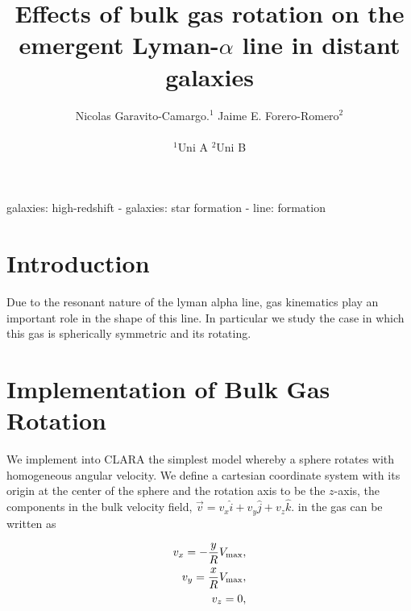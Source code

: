 \documentclass[usenatbib]{mn2e}
\begin{document}
\title[Rotation in the Lyman-$\alpha$ line]{Effects of bulk gas rotation on
  the emergent Lyman-$\alpha$ line in distant galaxies}
\author[N. Garavito and J.E. Forero-Romero]{
\parbox[t]{\textwidth}{\raggedright 
  Nicolas Garavito-Camargo.$^{1}$ 
  Jaime E. Forero-Romero$^{2}$ 
}
\vspace*{6pt}\\
$^{1}$Uni A
$^{2}$Uni B
}
\maketitle

\begin{abstract}

\end{abstract}
\begin{keywords}
galaxies: high-redshift - galaxies: star formation - line: formation
\end{keywords}


\section{Introduction}
\label{sec:intro}

Due to the resonant nature of the lyman alpha line, gas kinematics
play an important role in the shape of this line. In particular we
study the case in which this gas is spherically symmetric and its
rotating.


\section{Implementation of Bulk Gas Rotation}
\label{sec:implementation}

We implement into CLARA the simplest model whereby a sphere rotates
with homogeneous angular velocity. We define a cartesian coordinate
system with its origin at the center of the sphere and the rotation
axis to be the $z$-axis, the components in the bulk velocity field, $\vec{v}
= v_{x}\hat{i} + v_{y}\hat{j} + v_{z}\hat{k}$. in the gas can be written as 
 

\begin{subequations}
\begin{align}
    v_{x}=-\dfrac{y}{R}V_{\rm max}, \label{subeq1}\\
    v_{y}=\dfrac{x}{R}V_{\rm max}, \label{subeq2}\\
    v_{z}=0, \label{subeq3}
\end{align}
\end{subequations}
\end{document}
